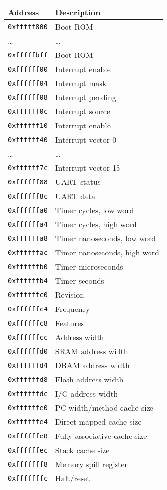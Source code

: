\documentclass[10pt,DIV12]{scrartcl}
\begin{document}
\begin{tabular}{ll}
  \toprule
  Address & Description \\
  \midrule
  \texttt{0xfffff800} & Boot ROM \\
  \ldots              & \ldots   \\
  \texttt{0xfffffbff} & Boot ROM \\
  \cmidrule{1-2}
  \texttt{0xffffff00} & Interrupt enable \\
  \texttt{0xffffff04} & Interrupt mask \\
  \texttt{0xffffff08} & Interrupt pending \\
  \texttt{0xffffff0c} & Interrupt source \\
  \texttt{0xffffff10} & Interrupt enable \\
  \texttt{0xffffff40} & Interrupt vector 0 \\
  \ldots              & \ldots   \\
  \texttt{0xffffff7c} & Interrupt vector 15 \\
  \cmidrule{1-2}
  \texttt{0xffffff88} & UART status \\
  \texttt{0xffffff8c} & UART data \\
  \cmidrule{1-2}
  \texttt{0xffffffa0} & Timer cycles, low word \\
  \texttt{0xffffffa4} & Timer cycles, high word \\
  \texttt{0xffffffa8} & Timer nanoseconds, low word \\
  \texttt{0xffffffac} & Timer nanoseconds, high word \\
  \texttt{0xffffffb0} & Timer microseconds \\
  \texttt{0xffffffb4} & Timer seconds \\
  \cmidrule{1-2}
  \texttt{0xffffffc0} & Revision \\
  \texttt{0xffffffc4} & Frequency \\
  \texttt{0xffffffc8} & Features \\
  \texttt{0xffffffcc} & Address width \\
  \texttt{0xffffffd0} & SRAM address width \\
  \texttt{0xffffffd4} & DRAM address width \\
  \texttt{0xffffffd8} & Flash address width \\
  \texttt{0xffffffdc} & I/O address width \\
  \texttt{0xffffffe0} & PC width/method cache size \\
  \texttt{0xffffffe4} & Direct-mapped cache size \\
  \texttt{0xffffffe8} & Fully associative cache size \\
  \texttt{0xffffffec} & Stack cache size \\
  \texttt{0xfffffff8} & Memory spill register \\
  \texttt{0xfffffffc} & Halt/reset \\
  \bottomrule
\end{tabular}
\end{document}
